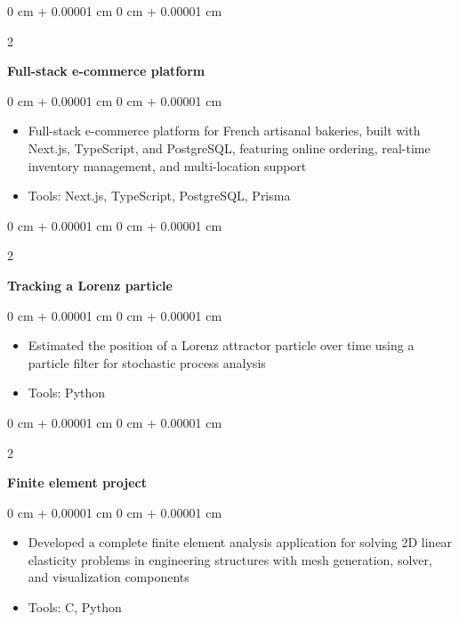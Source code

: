 \documentclass[10pt, letterpaper]{article}
\newenvironment{highlights}{
    \begin{itemize}[
        topsep=0.10 cm,
        parsep=0.10 cm,
        partopsep=0pt,
        itemsep=0pt,
        leftmargin=0 cm + 10pt
    ]
}{
    \end{itemize}
} %
\newenvironment{onecolentry}{
    \begin{adjustwidth}{
        0 cm + 0.00001 cm
    }{
        0 cm + 0.00001 cm
    }
}{
    \end{adjustwidth}
} %
\newenvironment{twocolentry}[2][]{
    \onecolentry
    \def\secondColumn{#2}
    \setcolumnwidth{\fill, 4.5 cm}
    \begin{paracol}{2}
}{
    \switchcolumn \raggedleft \secondColumn
    \end{paracol}
    \endonecolentry
} %
\begin{document}
        \begin{twocolentry}{
            
        }
            \textbf{Full-stack e-commerce platform}\end{twocolentry}
        \vspace{0.10 cm}
        \begin{onecolentry}
            \begin{highlights}
                \item Full-stack e-commerce platform for French artisanal bakeries, built with Next.js, TypeScript, and PostgreSQL, featuring online ordering, real-time inventory management, and multi-location support
                \item Tools: Next.js, TypeScript, PostgreSQL, Prisma
            \end{highlights}
        \end{onecolentry}
        \vspace{0.2 cm}
        
        \begin{twocolentry}{
            
        }
            \textbf{Tracking a Lorenz particle}\end{twocolentry}
        \vspace{0.10 cm}
        \begin{onecolentry}
            \begin{highlights}
                \item Estimated the position of a Lorenz attractor particle over time using a particle filter for stochastic process analysis
                \item Tools: Python
            \end{highlights}
        \end{onecolentry}
        \vspace{0.2 cm}
         
        
        \begin{twocolentry}{
            
        }
            \textbf{Finite element project}\end{twocolentry}
        \vspace{0.10 cm}
        \begin{onecolentry}
            \begin{highlights}
                \item Developed a complete finite element analysis application for solving 2D linear elasticity problems in engineering structures with mesh generation, solver, and visualization components
                \item Tools: C, Python
            \end{highlights}
        \end{onecolentry}
        \vspace{0.2 cm}
    \newpage
\end{document}
